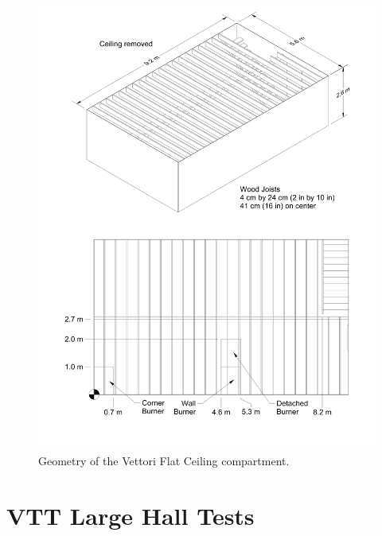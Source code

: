 \begin{figure}[\figoptions{b}]
\begin{center}
\includegraphics[width=6.5in]{FIGURES/Vettori_Flat/Vettori_Flat_Ceiling}
\end{center}
\caption[Geometry of the Vettori Flat Ceiling compartment]{Geometry of the Vettori Flat Ceiling compartment.}
\label{Vettori_Drawing}
\end{figure}

\section{VTT Large Hall Tests}


